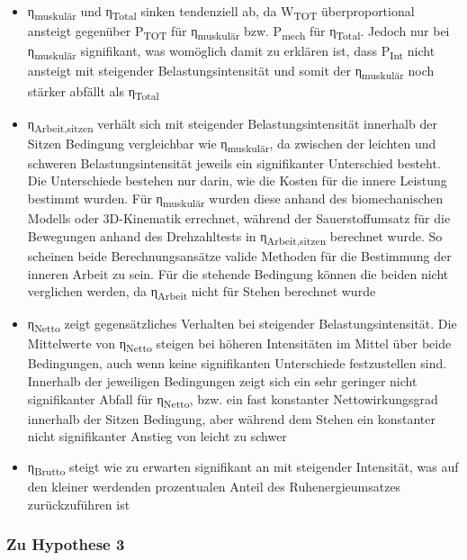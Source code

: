 \documentclass[
  letterpaper,
  DIV=11]{scrartcl}
\begin{document}
\begin{itemize}
  \begin{itemize}
  \item
    η\textsubscript{muskulär} und η\textsubscript{Total} sinken
    tendenziell ab, da W\textsubscript{TOT} überproportional ansteigt
    gegenüber P\textsubscript{TOT} für η\textsubscript{muskulär} bzw.
    P\textsubscript{mech} für η\textsubscript{Total}. Jedoch nur bei
    η\textsubscript{muskulär} signifikant, was womöglich damit zu
    erklären ist, dass P\textsubscript{Int} nicht ansteigt mit
    steigender Belastungsintensität und somit der
    η\textsubscript{muskulär} noch stärker abfällt als
    η\textsubscript{Total}
  \item
    η\textsubscript{Arbeit,sitzen} verhält sich mit steigender
    Belastungsintensität innerhalb der Sitzen Bedingung vergleichbar wie
    η\textsubscript{muskulär}, da zwischen der leichten und schweren
    Belastungsintensität jeweils ein signifikanter Unterschied besteht.
    Die Unterschiede bestehen nur darin, wie die Kosten für die innere
    Leistung bestimmt wurden. Für η\textsubscript{muskulär} wurden diese
    anhand des biomechanischen Modells oder 3D-Kinematik errechnet,
    während der Sauerstoffumsatz für die Bewegungen anhand des
    Drehzahltests in η\textsubscript{Arbeit,sitzen} berechnet wurde. So
    scheinen beide Berechnungsansätze valide Methoden für die Bestimmung
    der inneren Arbeit zu sein. Für die stehende Bedingung können die
    beiden nicht verglichen werden, da η\textsubscript{Arbeit} nicht für
    Stehen berechnet wurde
  \item
    η\textsubscript{Netto} zeigt gegensätzliches Verhalten bei
    steigender Belastungsintensität. Die Mittelwerte von
    η\textsubscript{Netto} steigen bei höheren Intensitäten im Mittel
    über beide Bedingungen, auch wenn keine signifikanten Unterschiede
    festzustellen sind. Innerhalb der jeweiligen Bedingungen zeigt sich
    ein sehr geringer nicht signifikanter Abfall für
    η\textsubscript{Netto}, bzw. ein fast konstanter Nettowirkungsgrad
    innerhalb der Sitzen Bedingung, aber während dem Stehen ein
    konstanter nicht signifikanter Anstieg von leicht zu schwer
  \item
    η\textsubscript{Brutto} steigt wie zu erwarten signifikant an mit
    steigender Intensität, was auf den kleiner werdenden prozentualen
    Anteil des Ruhenergieumsatzes zurückzuführen ist
  \end{itemize}
\end{itemize}

\subsubsection{Zu Hypothese 3}\label{zu-hypothese-3}
\end{document}
